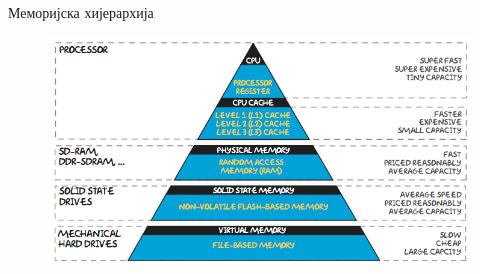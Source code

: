 \documentclass{beamer}
\begin{document}
\begin{frame}[allowframebreaks]{Меморијска хијерархија}
        \begin{figure}
            \centering
            \includegraphics[width=\textwidth,height=0.8\textheight,keepaspectratio]{images/mem1.jpg}
            \label{fig:mem1}
        \end{figure}
    \end{frame}
    
\end{document}
